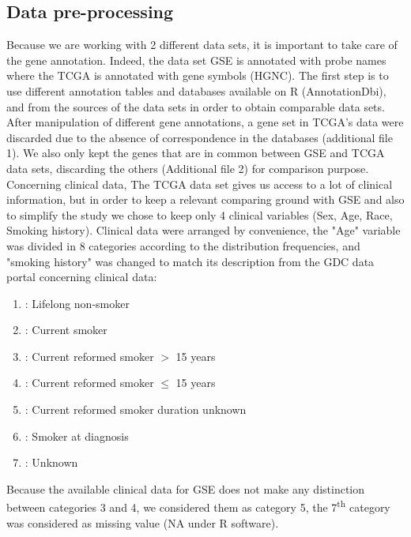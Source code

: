 \documentclass[twocolumn,12pt]{article}
\begin{document}
\subsection{Data pre-processing}\label{sec:preprocess}

Because we are working with 2 different data sets, it is important to take care of the gene annotation. Indeed, the data set GSE\cite{shedden} is annotated with probe names where the TCGA\cite{TCGA} is annotated with gene symbols (HGNC).
The first step is to use different annotation tables and databases available on R (AnnotationDbi)\cite{annot}, and from the sources of the data sets in order to obtain comparable data sets.
After manipulation of different gene annotations, a gene set in TCGA's data were discarded due to the absence of correspondence in the databases (additional file 1). We also only kept the genes that are in common between GSE and TCGA data sets, discarding the others (Additional file 2) for comparison purpose.
Concerning clinical data, The TCGA data set gives us access to a lot of clinical information, but in order to keep a relevant comparing ground with GSE and also to simplify the study we chose to keep only 4 clinical variables (Sex, Age, Race, Smoking history).
Clinical data were arranged by convenience, the "Age" variable was divided in 8 categories according to the distribution frequencies, and "smoking history" was changed to match its description from the GDC data portal concerning clinical data:
\begin{enumerate}
    \item : Lifelong non-smoker
    \item : Current smoker
    \item : Current reformed smoker $>$ 15 years
    \item : Current reformed smoker $\leq$ 15 years
    \item : Current reformed smoker duration unknown
    \item : Smoker at diagnosis
    \item : Unknown
\end{enumerate}

Because the available clinical data for GSE does not make any distinction between categories 3 and 4, we considered them as category 5, the 7\textsuperscript{th} category was considered as missing value (NA under R software).
\end{document}
